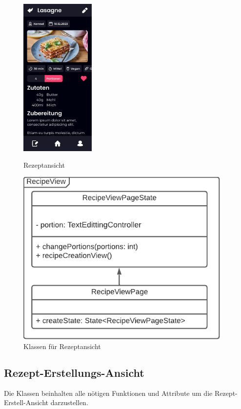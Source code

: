 \documentclass[parskip=full]{scrartcl}
\begin{document}
    \begin{figure}[htp]
        \begin{minipage}
            [t]{0.49\textwidth}
            \centering
            \includegraphics[height=80mm]{images/Presentation-layer/RecipeView.jpg}
            \caption{Rezeptansicht}
        \end{minipage}
        \begin{minipage}
            [t]{0.49\textwidth}
            \centering
            \includegraphics[width=0.95\textwidth]{images/Presentation-layer/RecipeViewClass.pdf}
            \caption{Klassen für Rezeptansicht}
        \end{minipage}
    \end{figure}    

    \newpage

\subsection{Rezept-Erstellungs-Ansicht}
    Die Klassen beinhalten alle nötigen Funktionen und Attribute um die Rezept-Erstell-Ansicht darzustellen.
\end{document}
